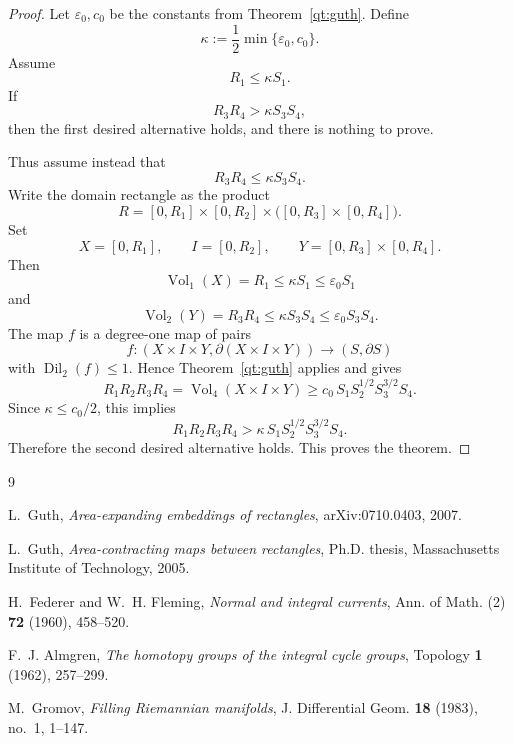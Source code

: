 \documentclass[12pt]{article}
\newcommand{\Vol}{\operatorname{Vol}}
\newcommand{\Dil}{\operatorname{Dil}}
\begin{document}
\begin{proof}
Let \(\varepsilon_0,c_0\) be the constants from
Theorem~\ref{qt:guth}. Define
\[
\kappa:=\frac12\min\{\varepsilon_0,c_0\}.
\]
Assume
\[
R_1\leq \kappa S_1.
\]
If
\[
R_3R_4>\kappa S_3S_4,
\]
then the first desired alternative holds, and there is nothing to prove.

Thus assume instead that
\[
R_3R_4\leq \kappa S_3S_4.
\]
Write the domain rectangle as the product
\[
R=[0,R_1]\times[0,R_2]\times\bigl([0,R_3]\times[0,R_4]\bigr).
\]
Set
\[
X=[0,R_1],\qquad I=[0,R_2],\qquad
Y=[0,R_3]\times[0,R_4].
\]
Then
\[
\Vol_1(X)=R_1\leq \kappa S_1\leq \varepsilon_0S_1
\]
and
\[
\Vol_2(Y)=R_3R_4\leq \kappa S_3S_4\leq \varepsilon_0S_3S_4.
\]
The map \(f\) is a degree-one map of pairs
\[
f:(X\times I\times Y,\partial(X\times I\times Y))
\longrightarrow (S,\partial S)
\]
with \(\Dil_2(f)\leq 1\). Hence Theorem~\ref{qt:guth} applies and gives
\[
R_1R_2R_3R_4
=
\Vol_4(X\times I\times Y)
\geq
c_0\,S_1S_2^{1/2}S_3^{3/2}S_4.
\]
Since \(\kappa\leq c_0/2\), this implies
\[
R_1R_2R_3R_4
>
\kappa\,S_1S_2^{1/2}S_3^{3/2}S_4.
\]
Therefore the second desired alternative holds. This proves the theorem.
\end{proof}

\begin{thebibliography}{9}

L.~Guth,
\emph{Area-expanding embeddings of rectangles},
arXiv:0710.0403, 2007.

L.~Guth,
\emph{Area-contracting maps between rectangles},
Ph.D. thesis, Massachusetts Institute of Technology, 2005.

H.~Federer and W.~H. Fleming,
\emph{Normal and integral currents},
Ann. of Math. (2) \textbf{72} (1960), 458--520.

F.~J. Almgren,
\emph{The homotopy groups of the integral cycle groups},
Topology \textbf{1} (1962), 257--299.

M.~Gromov,
\emph{Filling Riemannian manifolds},
J. Differential Geom. \textbf{18} (1983), no.~1, 1--147.

\end{thebibliography}
\end{document}
